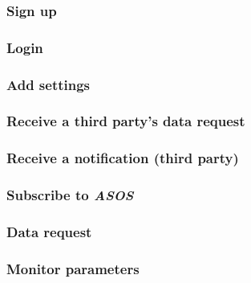 \def\A {Name}
\def\B {Actors}
\def\C {Entry conditions}
\def\D {Event Flow}
\def\E {Exit conditions}
\def\F {Exceptions}
\def\G {Goals}
\def\H {Requirements}

\renewcommand{\arraystretch}{1.5}

\subsubsection{Sign up}


\subsubsection{Login}


\subsubsection{Add settings}


\subsubsection{Receive a third party's data request}


\subsubsection{Receive a notification (third party)}


\subsubsection{Subscribe to \textit{ASOS}}


\subsubsection{Data request}


\subsubsection{Monitor parameters}
